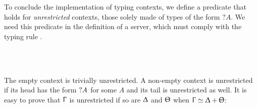To conclude the implementation of typing contexts, we define a predicate
 that holds for \emph{unrestricted} contexts, those solely made
of types of the form $?A$. We need this predicate in the definition of a server,
which must comply with the typing rule \ServerRule.

\begin{code}%
\>[0]\AgdaSpace{}%
\AgdaSpace{}%
\AgdaSymbol{:}\AgdaSpace{}%
\AgdaSpace{}%
\AgdaSpace{}%
\AgdaSpace{}%
\<%
\\
\>[0][@{}l@{\AgdaIndent{0}}]%
\>[2]%
\>[9]\AgdaSymbol{:}\AgdaSpace{}%
\AgdaSpace{}%
\AgdaInductiveConstructor{[]}\<%
\\
%
\>[2]%
\>[9]\AgdaSymbol{:}\AgdaSpace{}%
\AgdaSymbol{\}}\AgdaSpace{}%
\AgdaSpace{}%
\AgdaFunction{∀[}\AgdaSpace{}%
\AgdaSpace{}%
\AgdaSpace{}%
\AgdaSymbol{(}\AgdaSpace{}%
\AgdaSpace{}%
\AgdaSymbol{)}\AgdaSpace{}%
\AgdaSpace{}%
\AgdaSpace{}%
\AgdaFunction{]}\<%
\end{code}

The empty context is trivially unrestricted. A non-empty context is unrestricted
if its head has the form $\WhyNot A$ for some $A$ and its tail is unrestricted
as well.
%
It is easy to prove that $\Upgamma$ is unrestricted if so are $\Updelta$ and
$\Uptheta$ when $\Upgamma \simeq \Updelta + \Uptheta$:

